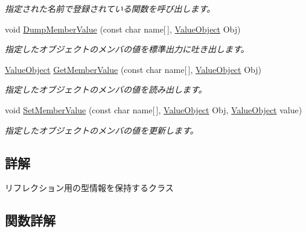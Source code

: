 \begin{DoxyCompactItemize}
\begin{DoxyCompactList}\small\item\em 指定された名前で登録されている関数を呼び出します。\end{DoxyCompactList}\item 
void \hyperlink{class_reflection_1_1_type_base_a57a6ce419728daa5554a22c85199b197}{Dump\+Member\+Value} (const char name\mbox{[}$\,$\mbox{]}, \hyperlink{class_reflection_1_1_value_object}{Value\+Object} Obj)
\begin{DoxyCompactList}\small\item\em 指定したオブジェクトのメンバの値を標準出力に吐き出します。\end{DoxyCompactList}\item 
\hyperlink{class_reflection_1_1_value_object}{Value\+Object} \hyperlink{class_reflection_1_1_type_base_ab9dd0ad1f29a70f41af71081d55dd7af}{Get\+Member\+Value} (const char name\mbox{[}$\,$\mbox{]}, \hyperlink{class_reflection_1_1_value_object}{Value\+Object} Obj)
\begin{DoxyCompactList}\small\item\em 指定したオブジェクトのメンバの値を読み出します。\end{DoxyCompactList}\item 
void \hyperlink{class_reflection_1_1_type_base_a1ff9eb1a2b5f8acbd9d0098c2c922403}{Set\+Member\+Value} (const char name\mbox{[}$\,$\mbox{]}, \hyperlink{class_reflection_1_1_value_object}{Value\+Object} Obj, \hyperlink{class_reflection_1_1_value_object}{Value\+Object} value)
\begin{DoxyCompactList}\small\item\em 指定したオブジェクトのメンバの値を更新します。\end{DoxyCompactList}\end{DoxyCompactItemize}


\subsection{詳解}
リフレクション用の型情報を保持するクラス



\subsection{関数詳解}
